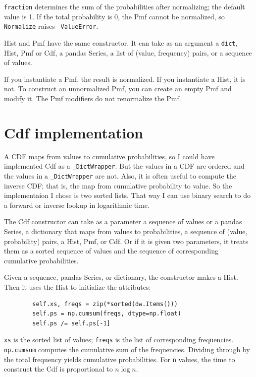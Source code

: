 {\tt fraction} determines the sum of the probabilities after
normalizing; the default value is 1.  If the total probability is 0,
the Pmf cannot be normalized, so {\tt Normalize} raises {\tt
  ValueError}.

Hist and Pmf have the same constructor.  It can take
as an argument a {\tt dict}, Hist, Pmf or Cdf, a pandas
Series, a list of (value, frequency) pairs, or a sequence of values.

If you instantiate a Pmf, the result is normalized.  If you
instantiate a Hist, it is not.  To construct an unnormalized Pmf,
you can create an empty Pmf and modify it.  The Pmf modifiers do
not renormalize the Pmf.


\section{Cdf implementation}

A CDF maps from values to cumulative probabilities, so I could have
implemented Cdf as a \verb"_DictWrapper".  But the values in a CDF are
ordered and the values in a \verb"_DictWrapper" are not.  Also, it is
often useful to compute the inverse CDF; that is, the map from
cumulative probability to value.  So the implementaion I chose is two
sorted lists.  That way I can use binary search to do a forward or
inverse lookup in logarithmic time.

The Cdf constructor can take as a parameter a sequence of values
or a pandas Series, a dictionary that maps from values to
probabilities, a sequence of (value, probability) pairs, a Hist, Pmf,
or Cdf.  Or if it is given two parameters, it treats them as a sorted
sequence of values and the sequence of corresponding cumulative
probabilities.

Given a sequence, pandas Series, or dictionary, the constructor makes
a Hist.  Then it uses the Hist to initialize the attributes:

\begin{verbatim}
        self.xs, freqs = zip(*sorted(dw.Items()))
        self.ps = np.cumsum(freqs, dtype=np.float)
        self.ps /= self.ps[-1]
\end{verbatim}

{\tt xs} is the sorted list of values; {\tt freqs} is the list
of corresponding frequencies.  {\tt np.cumsum} computes
the cumulative sum of the frequencies.  Dividing through by the
total frequency yields cumulative probabilities.
For {\tt n} values, the time to construct the
Cdf is proportional to $n \log n$.

